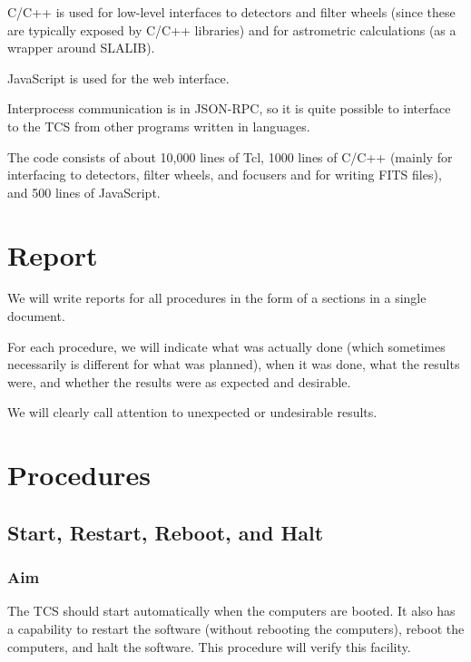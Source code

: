 \documentclass{article}
\begin{document}
C/C++ is used for low-level interfaces to detectors and filter wheels (since these are typically exposed by C/C++ libraries) and for astrometric calculations (as a wrapper around SLALIB).

JavaScript is used for the web interface.

Interprocess communication is in JSON-RPC, so it is quite possible to interface to the TCS from other programs written in languages.

The code consists of about 10,000 lines of Tcl, 1000 lines of C/C++ (mainly for interfacing to detectors, filter wheels, and focusers and for writing FITS files), and 500 lines of JavaScript.


\section{Report}
\label{section:report}

We will write reports for all procedures in the form of a sections in a single document.

For each procedure, we will indicate what was actually done (which sometimes necessarily is different for what was planned), when it was done, what the results were, and whether the results were as expected and desirable.

We will clearly call attention to unexpected or undesirable results.

\section{Procedures}
\label{section:procedures}



\subsection{Start, Restart, Reboot, and Halt}

\subsubsection{Aim}

The TCS should start automatically when the computers are booted. It also has a capability to restart the software (without rebooting the computers), reboot the computers, and halt the software. This procedure will verify this facility.
\end{document}
